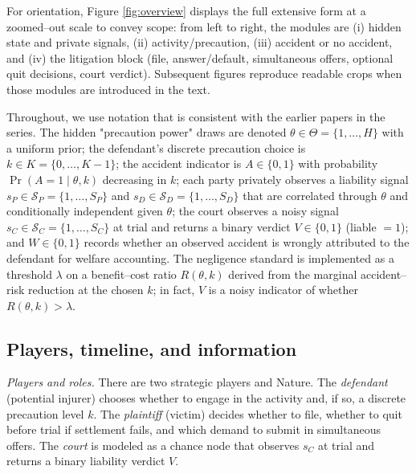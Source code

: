 \documentclass{article}
\begin{document}
For orientation, Figure \ref{fig:overview} displays the full extensive form at a zoomed--out scale to convey scope: from left to right, the modules are (i) hidden state and private signals, (ii) activity/precaution, (iii) accident or no accident, and (iv) the litigation block (file, answer/default, simultaneous offers, optional quit decisions, court verdict). Subsequent figures reproduce readable crops when those modules are introduced in the text.

Throughout, we use notation that is consistent with the earlier papers in the series. The hidden "precaution power" draws are denoted $\theta\in\Theta=\{1,\dots,H\}$ with a uniform prior; the defendant's discrete precaution choice is $k\in K=\{0,\dots,K-1\}$; the accident indicator is $A\in\{0,1\}$ with probability $\Pr(A{=}1\mid \theta,k)$ decreasing in $k$; each party privately observes a liability signal $s_P\in\mathcal{S}_P=\{1,\dots,S_P\}$ and $s_D\in\mathcal{S}_D=\{1,\dots,S_D\}$ that are correlated through $\theta$ and conditionally independent given $\theta$; the court observes a noisy signal $s_C\in\mathcal{S}_C=\{1,\dots,S_C\}$ at trial and returns a binary verdict $V\in\{0,1\}$ (liable $=1$); and $W\in\{0,1\}$ records whether an observed accident is wrongly attributed to the defendant for welfare accounting. The negligence standard is implemented as a threshold $\lambda$ on a benefit--cost ratio $R(\theta,k)$ derived from the marginal accident--risk reduction at the chosen $k$; in fact, $V$ is a noisy indicator of whether $R(\theta,k)>\lambda$.

\subsection{Players, timeline, and information}
\emph{Players and roles.} There are two strategic players and Nature. The \emph{defendant} (potential injurer) chooses whether to engage in the activity and, if so, a discrete precaution level $k$. The \emph{plaintiff} (victim) decides whether to file, whether to quit before trial if settlement fails, and which demand to submit in simultaneous offers. The \emph{court} is modeled as a chance node that observes $s_C$ at trial and returns a binary liability verdict $V$.
\end{document}
